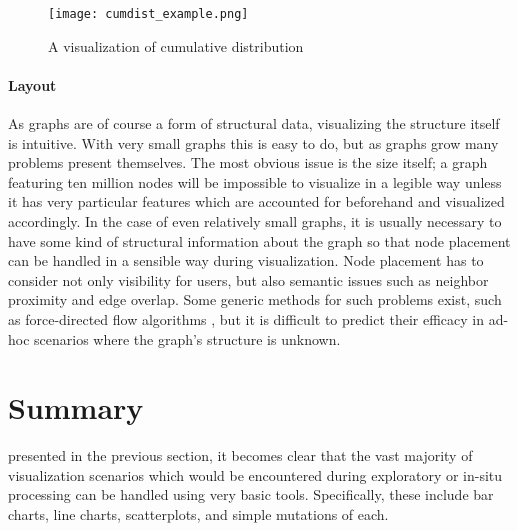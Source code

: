 \begin{figure}
	\centering
	\texttt{[image: cumdist\_example.png]}
	\caption{A visualization of cumulative distribution \cite{KONECT}}
	\label{fig:cumdist}
\end{figure}

\paragraph{Layout}
As graphs are of course a form of structural data, visualizing the structure itself is intuitive. With very small graphs this is easy to do, but as graphs grow many problems present themselves. The most obvious issue is the size itself; a graph featuring ten million nodes will be impossible to visualize in a legible way unless it has very particular features which are accounted for beforehand and visualized accordingly. In the case of even relatively small graphs, it is usually necessary to have some kind of structural information about the graph so that node placement can be handled in a sensible way during visualization. Node placement has to consider not only visibility for users, but also semantic issues such as neighbor proximity and edge overlap. Some generic methods for such problems exist, such as force-directed flow algorithms \cite{Didimo2011}, but it is difficult to predict their efficacy in ad-hoc scenarios where the graph's structure is unknown.
 


\section{Summary}
\label{sec:vis_summary}
 presented in the previous section, it becomes clear that the vast majority of visualization scenarios which would be encountered during exploratory or in-situ processing can be handled using very basic tools. Specifically, these include bar charts, line charts, scatterplots, and simple mutations of each. 



